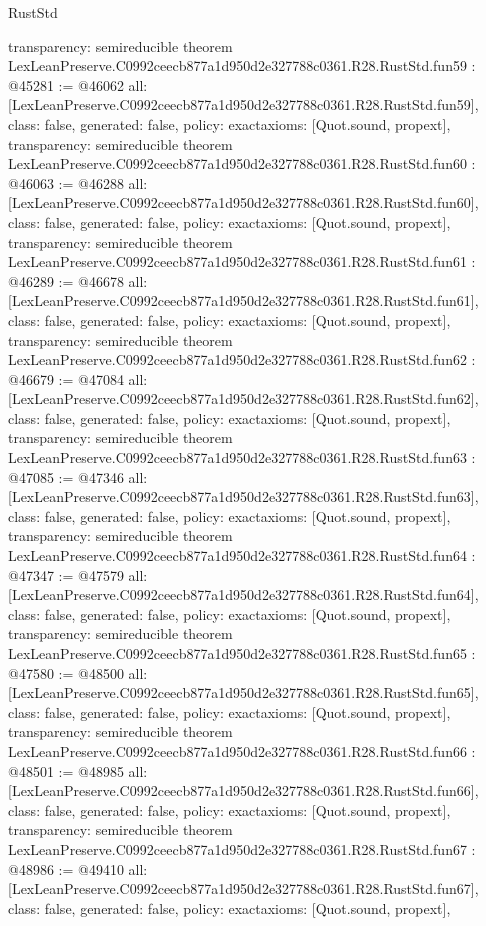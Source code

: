 \begin{lexlean}{RustStd}
\begin{coremodule}
{  transparency: semireducible
}
theorem LexLeanPreserve.C0992ceecb877a1d950d2e327788c0361.R28.RustStd.fun59 : @45281 := @46062 {
  all: [LexLeanPreserve.C0992ceecb877a1d950d2e327788c0361.R28.RustStd.fun59],
  class: false,
  generated: false,
  policy: exact{axioms: [Quot.sound, propext]},
  transparency: semireducible
}
theorem LexLeanPreserve.C0992ceecb877a1d950d2e327788c0361.R28.RustStd.fun60 : @46063 := @46288 {
  all: [LexLeanPreserve.C0992ceecb877a1d950d2e327788c0361.R28.RustStd.fun60],
  class: false,
  generated: false,
  policy: exact{axioms: [Quot.sound, propext]},
  transparency: semireducible
}
theorem LexLeanPreserve.C0992ceecb877a1d950d2e327788c0361.R28.RustStd.fun61 : @46289 := @46678 {
  all: [LexLeanPreserve.C0992ceecb877a1d950d2e327788c0361.R28.RustStd.fun61],
  class: false,
  generated: false,
  policy: exact{axioms: [Quot.sound, propext]},
  transparency: semireducible
}
theorem LexLeanPreserve.C0992ceecb877a1d950d2e327788c0361.R28.RustStd.fun62 : @46679 := @47084 {
  all: [LexLeanPreserve.C0992ceecb877a1d950d2e327788c0361.R28.RustStd.fun62],
  class: false,
  generated: false,
  policy: exact{axioms: [Quot.sound, propext]},
  transparency: semireducible
}
theorem LexLeanPreserve.C0992ceecb877a1d950d2e327788c0361.R28.RustStd.fun63 : @47085 := @47346 {
  all: [LexLeanPreserve.C0992ceecb877a1d950d2e327788c0361.R28.RustStd.fun63],
  class: false,
  generated: false,
  policy: exact{axioms: [Quot.sound, propext]},
  transparency: semireducible
}
theorem LexLeanPreserve.C0992ceecb877a1d950d2e327788c0361.R28.RustStd.fun64 : @47347 := @47579 {
  all: [LexLeanPreserve.C0992ceecb877a1d950d2e327788c0361.R28.RustStd.fun64],
  class: false,
  generated: false,
  policy: exact{axioms: [Quot.sound, propext]},
  transparency: semireducible
}
theorem LexLeanPreserve.C0992ceecb877a1d950d2e327788c0361.R28.RustStd.fun65 : @47580 := @48500 {
  all: [LexLeanPreserve.C0992ceecb877a1d950d2e327788c0361.R28.RustStd.fun65],
  class: false,
  generated: false,
  policy: exact{axioms: [Quot.sound, propext]},
  transparency: semireducible
}
theorem LexLeanPreserve.C0992ceecb877a1d950d2e327788c0361.R28.RustStd.fun66 : @48501 := @48985 {
  all: [LexLeanPreserve.C0992ceecb877a1d950d2e327788c0361.R28.RustStd.fun66],
  class: false,
  generated: false,
  policy: exact{axioms: [Quot.sound, propext]},
  transparency: semireducible
}
theorem LexLeanPreserve.C0992ceecb877a1d950d2e327788c0361.R28.RustStd.fun67 : @48986 := @49410 {
  all: [LexLeanPreserve.C0992ceecb877a1d950d2e327788c0361.R28.RustStd.fun67],
  class: false,
  generated: false,
  policy: exact{axioms: [Quot.sound, propext]},
}
\end{coremodule}
\end{lexlean}
